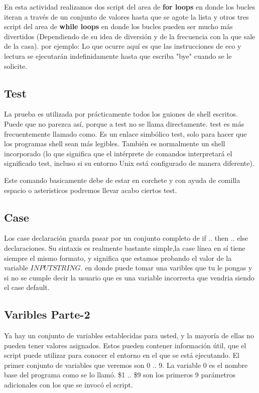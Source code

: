 \documentclass{article}
\begin{document}
\begin{itemize}
En esta actividad realizamos dos script del area de \textbf{for loops} en donde los bucles iteran a través de un conjunto de valores hasta que se agote la lista y otros tres script del area de  \textbf{while loops} en donde los bucles pueden ser mucho más divertidos (Dependiendo de su idea de diversión y de la frecuencia con la que sale de la casa). por ejemplo: Lo que ocurre aquí es que las instrucciones de eco y lectura se ejecutarán indefinidamente hasta que escriba "bye" cuando se le solicite. 

\subsection{Test}
La prueba es utilizada por prácticamente todos los guiones de shell escritos. Puede que no parezca así, porque a test no se llama directamente. test es más frecuentemente llamado como. Es un enlace simbólico test, solo para hacer que los programas shell sean más legibles. También es normalmente un shell incorporado (lo que significa que el intérprete de comandos interpretará el significado test, incluso si su entorno Unix está configurado de manera diferente).

Este comando basicamente debe de estar en corchete y con ayuda de comilla espacio o asteristicos podremos llevar acabo ciertos test.


\subsection{Case}
Los case declaración guarda pasar por un conjunto completo de if .. then .. else declaraciones. Su sintaxis es realmente bastante simple,la case línea en sí tiene siempre el mismo formato, y significa que estamos probando el valor de la variable $INPUT STRING.$ en donde puede tomar una varibles que tu le pongas y si no se cumple decir la usuario que es una variable incorrecta que vendria siendo el case default.


\subsection{Varibles Parte-2}
Ya hay un conjunto de variables establecidas para usted, y la mayoría de ellas no pueden tener valores asignados. 
Estos pueden contener información útil, que el script puede utilizar para conocer el entorno en el que se está ejecutando.
El primer conjunto de variables que veremos son 0 .. 9. 
La variable 0 es el nombre base del programa como se lo llamó. 
\$1 .. \$9 son los primeros 9 parámetros adicionales con los que se invocó el script.


\end{itemize}
\end{document}
